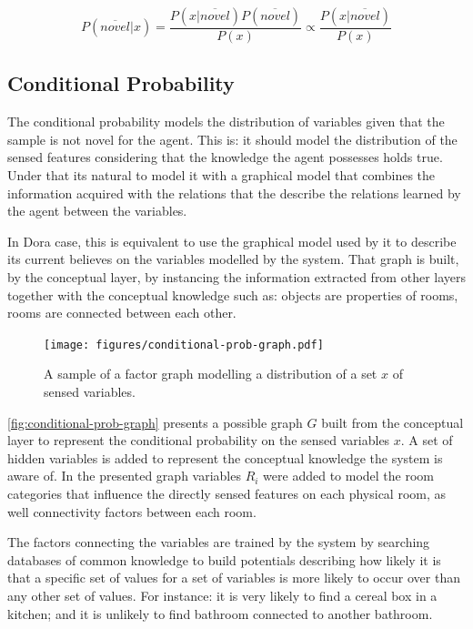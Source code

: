 \documentclass[runningheads,a4paper]{llncs}
\begin{document}
\begin{equation}
\label{eq:novelty-threshold}
          P(\overline{novel}|x)
  =       \frac{P(x|\overline{novel}) P(\overline{novel})}{P(x)}
  \propto \frac{P(x|\overline{novel})}{P(x)}
\end{equation}

\subsection{Conditional Probability}
\label{sec:conditional-prob}

The conditional probability models the distribution of variables given that the sample
is not novel for the agent.
This is: it should model the distribution of the sensed features considering that the
knowledge the agent possesses holds true. Under that its natural to model it with a graphical
model that combines the information acquired with the relations that the describe the
relations learned by the agent between the variables.

In Dora case, this is equivalent to use the graphical model used by it to describe its
current believes on the variables modelled by the system.
That graph is built, by the conceptual layer, by instancing the information extracted from
other layers together with the conceptual knowledge such as: objects are properties of rooms,
rooms are connected between each other.

\begin{figure}[h]
\centering
\texttt{[image: figures/conditional-prob-graph.pdf]}
\caption{\label{fig:conditional-prob-graph}A sample of a factor graph modelling a distribution
         of a set $x$ of sensed variables.}
\end{figure}

\autoref{fig:conditional-prob-graph} presents a possible graph $G$ built from the conceptual
layer to represent the conditional probability on the sensed variables $x$.
A set of hidden variables is added to represent the conceptual knowledge the system is aware of.
In the presented graph variables $R_i$ were added to model the room categories that influence
the directly sensed features on each physical room, as well connectivity factors between each
room.

The factors connecting the variables are trained by the system by searching databases of
common knowledge to build potentials describing how likely it is that a specific set of
values for a set of variables is more likely to occur over than any other set of values.
For instance: it is very likely to find a cereal box in a kitchen; and it is unlikely to find
bathroom connected to another bathroom.
\end{document}
